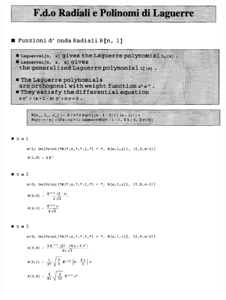 \begin{figure}[!htbp]
\begin{center}
\includegraphics[width= \textwidth]{immagini/cap_21/fig_21_2.png}\\
\end{center}
\end{figure}
